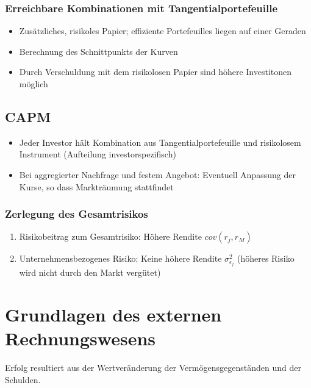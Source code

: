 \subsubsection{Erreichbare Kombinationen mit Tangentialportefeuille}
\begin{itemize}
	\item Zusätzliches, risikoles Papier; effiziente Portefeuilles liegen auf einer Geraden
	\item Berechnung des Schnittpunkts der Kurven
	\item Durch Verschuldung mit dem risikolosen Papier sind höhere Investitonen möglich
\end{itemize}


\subsection{CAPM}
\begin{itemize}
	\item Jeder Investor hält Kombination aus Tangentialportefeuille und risikolosem Instrument (Aufteilung investorspezifisch)
	\item Bei aggregierter Nachfrage und festem Angebot: Eventuell Anpassung der Kurse, so dass Markträumung stattfindet
\end{itemize}

\subsubsection{Zerlegung des Gesamtrisikos}
\begin{enumerate}
	\item Risikobeitrag zum Gesamtrisiko: Höhere Rendite \(cov(r_j,r_M)\)
	\item Unternehmensbezogenes Risiko: Keine höhere Rendite \(\sigma^2_{\epsilon_j}\) (höheres Risiko wird nicht durch den Markt vergütet)
\end{enumerate}



\section{Grundlagen des externen Rechnungswesens}
Erfolg resultiert aus der Wertveränderung der Vermögensgegenständen und der Schulden.

